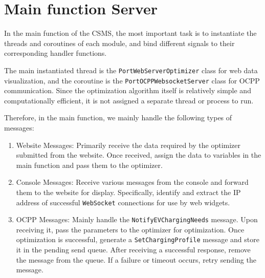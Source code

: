 \documentclass[
	english,
	ruledheaders=section,%
	class=report,%
	thesis={type=Report},%
	accentcolor=9c,%
	custommargins=true,%
	marginpar=false,%
	parskip=half-,%
	fontsize=11pt,%
	logofile={img/tuda_logo.pdf}, %
]{tudapub}
\begin{document}
\section{Main function Server}
\label{sec:Server}


In the main function of the \ac{CSMS}, the most important task is to instantiate the threads and coroutines of each module, and bind different signals to their corresponding handler functions.

The main instantiated thread is the \texttt{PortWebServerOptimizer} class for web data visualization, and the coroutine is the \texttt{PortOCPPWebsocketServer} class for \ac{OCPP} communication.
Since the optimization algorithm itself is relatively simple and computationally efficient, it is not assigned a separate thread or process to run.



Therefore, in the main function, we mainly handle the following types of messages:

\begin{enumerate}

\item Website Messages: Primarily receive the data required by the optimizer submitted from the website. Once received, assign the data to variables in the main function and pass them to the optimizer.

\item Console Messages: Receive various messages from the console and forward them to the website for display. Specifically, identify and extract the IP address of successful \texttt{WebSocket} connections for use by web widgets.

\item \ac{OCPP} Messages: Mainly handle the \texttt{NotifyEVChargingNeeds} message. Upon receiving it, pass the parameters to the optimizer for optimization. Once optimization is successful, generate a \texttt{SetChargingProfile} message and store it in the pending send queue. After receiving a successful response, remove the message from the queue. If a failure or timeout occurs, retry sending the message.

\end{enumerate}
\end{document}
